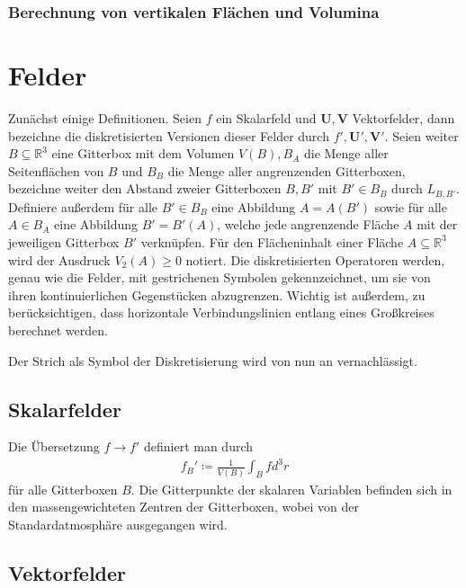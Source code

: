 \documentclass{book}
\begin{document}
\subsubsection{Berechnung von vertikalen Flächen und Volumina}
\label{sec:berechnung_von_vertikalen_flächen_und_volumina}

\section{Felder}
\label{sec:felder}

Zunächst einige Definitionen. Seien $f$ ein Skalarfeld und $\mathbf{U}, \mathbf{V}$ Vektorfelder, dann bezeichne die diskretisierten Versionen dieser Felder durch $f', \mathbf{U}', \mathbf{V}'$. Seien weiter $B\subseteq\mathbb{R}^3$ eine Gitterbox mit dem Volumen $V\left(B\right), B_A$ die Menge aller Seitenflächen von $B$ und $B_B$ die Menge aller angrenzenden Gitterboxen, bezeichne weiter den Abstand zweier Gitterboxen $B, B'$ mit $B'\in B_B$ durch $L_{B, B'}$. Definiere außerdem für alle $B'\in B_B$ eine Abbildung $A = A\left(B'\right)$ sowie für alle $A\in B_A$ eine Abbildung $B' = B'\left(A\right)$, welche jede angrenzende Fläche $A$ mit der jeweiligen Gitterbox $B'$ verknüpfen. Für den Flächeninhalt einer Fläche $A\subseteq\mathbb{R}^3$ wird der Ausdruck $V_2\left(A\right)\geq 0$ notiert. Die diskretisierten Operatoren werden, genau wie die Felder, mit gestrichenen Symbolen gekennzeichnet, um sie von ihren kontinuierlichen Gegenstücken abzugrenzen. Wichtig ist außerdem, zu berücksichtigen, dass horizontale Verbindungslinien entlang eines Großkreises berechnet werden.

Der Strich als Symbol der Diskretisierung wird von nun an vernachlässigt.

\subsection{Skalarfelder}
\label{sec:skalarfelder}

Die Übersetzung $f\to f'$ definiert man durch
%
\begin{eqnarray}
f_B' \coloneqq\frac{1}{V\left(B\right)}\int_Bfd^3r
\end{eqnarray}
%
für alle Gitterboxen $B$. Die Gitterpunkte der skalaren Variablen befinden sich in den massengewichteten Zentren der Gitterboxen, wobei von der Standardatmosphäre ausgegangen wird.

\subsection{Vektorfelder}
\label{sec:vektorfelder}
\end{document}

